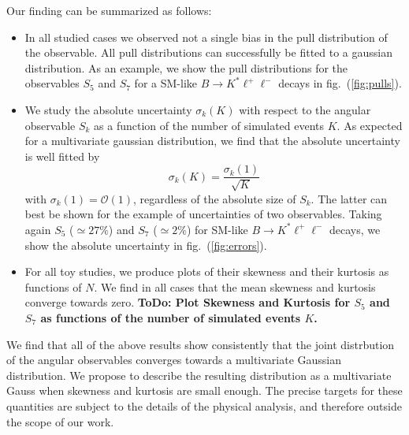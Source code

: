 \documentclass[aps,prd,reprint,nofootinbib,preprintnumbers]{revtex4}
\newcommand{\order}[1]{\mathcal{O}\left({#1}\right)}
\newcommand{\reffig}[1]{fig.~(\ref{fig:#1})}
\newcommand{\todo}[1]{{\color{red}\bf ToDo: #1}}
\begin{document}
Our finding can be summarized as follows:
\begin{itemize}
    \item In all studied cases we observed not a single bias in the pull distribution of the observable.
        All pull distributions can successfully be fitted to a gaussian distribution. As an example, we
        show the pull distributions for the observables $S_5$ and $S_7$ for a SM-like $B\to K^*\ell^+\ell^-$
        decays in \reffig{pulls}.
    \item We study the absolute uncertainty $\sigma_k(K)$ with respect to the angular observable $S_k$
        as a function of the number of simulated events $K$. As expected for a multivariate gaussian
        distribution, we find that the absolute uncertainty is well fitted by
        \begin{equation}
            \label{eq:unc-on-mean}
            \sigma_k(K) = \frac{\sigma_k(1)}{\sqrt{K}}
        \end{equation}
        with $\sigma_k(1) = \order{1}$, regardless of the absolute size of $S_k$. The latter can best be shown
        for the example of uncertainties of two observables. Taking again $S_5$ ($\simeq 27\%$) and $S_7$ ($\simeq 2\%$)
        for SM-like $B\to K^*\ell^+\ell^-$ decays, we show the absolute uncertainty in \reffig{errors}.
    \item For all toy studies, we produce plots of their skewness and their kurtosis as functions of
        $N$. We find in all cases that the mean skewness and kurtosis converge towards zero.
        \todo{Plot Skewness and Kurtosis for $S_5$ and $S_7$ as functions of the number of simulated events $K$.}
\end{itemize}
We find that all of the above results show consistently that the joint distrbution of the angular observables
converges towards a multivariate Gaussian distribution. We propose to describe the resulting distribution as
a multivariate Gauss when skewness and kurtosis are small enough. The precise targets for these quantities
are subject to the details of the physical analysis, and therefore outside the scope of our work.
\end{document}
